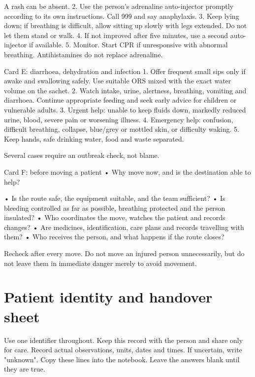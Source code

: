 \documentclass[10pt,openright]{book}
\begin{document}
A rash can be absent. 2. Use the person's adrenaline auto-injector promptly according to its own instructions. Call 999 and say anaphylaxis. 3. Keep lying down; if breathing is difficult, allow sitting up slowly with legs extended. Do not let them stand or walk. 4. If not improved after five minutes, use a second auto-injector if available. 5. Monitor. Start CPR if unresponsive with abnormal breathing. Antihistamines do not replace adrenaline.

Card E: diarrhoea, dehydration and infection 1. Offer frequent small sips only if awake and swallowing safely. Use suitable ORS mixed with the exact water volume on the sachet. 2. Watch intake, urine, alertness, breathing, vomiting and diarrhoea. Continue appropriate feeding and seek early advice for children or vulnerable adults. 3. Urgent help: unable to keep fluids down, markedly reduced urine, blood, severe pain or worsening illness. 4. Emergency help: confusion, difficult breathing, collapse, blue/grey or mottled skin, or difficulty waking. 5. Keep hands, safe drinking water, food and waste separated.

Several cases require an outbreak check, not blame.

Card F: before moving a patient • Why move now, and is the destination able to help?

• Is the route safe, the equipment suitable, and the team sufficient? • Is bleeding controlled as far as possible, breathing protected and the person insulated? • Who coordinates the move, watches the patient and records changes? • Are medicines, identification, care plans and records travelling with them? • Who receives the person, and what happens if the route closes?

Recheck after every move. Do not move an injured person unnecessarily, but do not leave them in immediate danger merely to avoid movement.

\section*{Patient identity and handover sheet}
Use one identifier throughout. Keep this record with the person and share only for care. Record actual observations, units, dates and times. If uncertain, write "unknown". Copy these lines into the notebook. Leave the answers blank until they are true.
\end{document}
